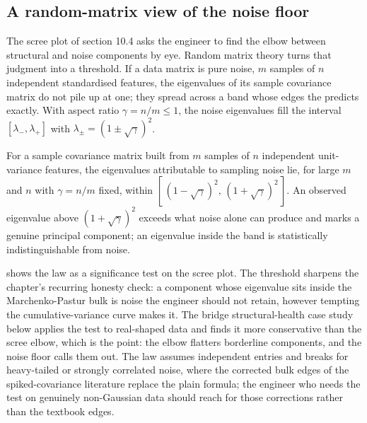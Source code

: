 \subsection{A random-matrix view of the noise floor}

The scree plot of section 10.4 asks the engineer to find the elbow
between structural and noise components by eye. Random matrix theory
turns that judgment into a threshold. If a data matrix is pure noise,
$m$ samples of $n$ independent standardised features, the eigenvalues
of its sample covariance matrix do not pile up at one; they spread
across a band whose edges the  predicts
exactly. With aspect ratio $\gamma = n/m \leq 1$, the noise eigenvalues
fill the interval $[\lambda_{-}, \lambda_{+}]$ with $\lambda_{\pm} =
(1 \pm \sqrt{\gamma})^{2}$.

\begin{principle}
For a sample covariance matrix built from $m$ samples of $n$
independent unit-variance features, the eigenvalues attributable to
sampling noise lie, for large $m$ and $n$ with $\gamma = n/m$ fixed,
within $[\,(1 - \sqrt{\gamma})^{2},\, (1 + \sqrt{\gamma})^{2}\,]$. An
observed eigenvalue above $(1 + \sqrt{\gamma})^{2}$ exceeds what noise
alone can produce and marks a genuine principal component; an
eigenvalue inside the band is statistically indistinguishable from
noise.
\end{principle}



 shows the law as a significance
test on the scree plot. The threshold sharpens the chapter's recurring
honesty check: a component whose eigenvalue sits inside the
Marchenko-Pastur bulk is noise the engineer should not retain, however
tempting the cumulative-variance curve makes it. The bridge
structural-health case study below applies the test to real-shaped data
and finds it more conservative than the scree elbow, which is the point:
the elbow
flatters borderline components, and the noise floor calls them out. The
law assumes independent entries and breaks for heavy-tailed or strongly
correlated noise, where the corrected bulk edges of the spiked-covariance
literature replace the plain formula; the engineer who needs the test on
genuinely non-Gaussian data should reach for those corrections rather
than the textbook edges.

